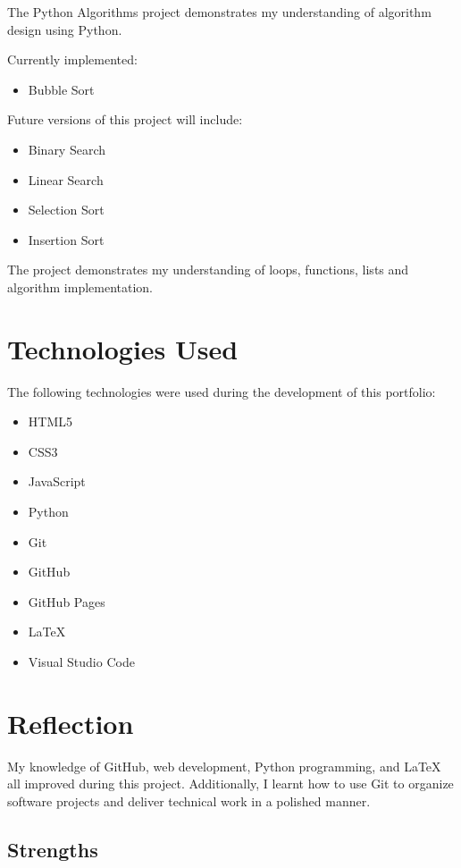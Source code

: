 \documentclass[12pt,a4paper]{article}
\begin{document}
The Python Algorithms project demonstrates my understanding of algorithm design using Python.

Currently implemented:

\begin{itemize}
\item Bubble Sort
\end{itemize}

Future versions of this project will include:

\begin{itemize}
\item Binary Search
\item Linear Search
\item Selection Sort
\item Insertion Sort
\end{itemize}

The project demonstrates my understanding of loops, functions, lists and algorithm implementation.

\section{Technologies Used}

The following technologies were used during the development of this portfolio:

\begin{itemize}
\item HTML5
\item CSS3
\item JavaScript
\item Python
\item Git
\item GitHub
\item GitHub Pages
\item LaTeX
\item Visual Studio Code
\end{itemize}

\section{Reflection}

My knowledge of GitHub, web development, Python programming, and LaTeX all improved during this project. Additionally, I learnt how to use Git to organize software projects and deliver technical work in a polished manner.

\subsection{Strengths}
\end{document}
